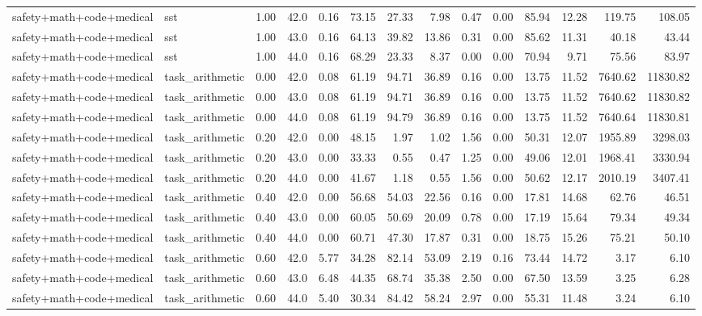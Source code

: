 \documentclass{article}
\begin{document}
\begin{table}[H]
{\begin{tabular}{llllrrrrrrrrrr}
safety+math+code+medical & sst & 1.00 & 42.0 & 0.16 & 73.15 & 27.33 & 7.98 & 0.47 & 0.00 & 85.94 & 12.28 & 119.75 & 108.05 \\
safety+math+code+medical & sst & 1.00 & 43.0 & 0.16 & 64.13 & 39.82 & 13.86 & 0.31 & 0.00 & 85.62 & 11.31 & 40.18 & 43.44 \\
safety+math+code+medical & sst & 1.00 & 44.0 & 0.16 & 68.29 & 23.33 & 8.37 & 0.00 & 0.00 & 70.94 & 9.71 & 75.56 & 83.97 \\
safety+math+code+medical & task\_arithmetic & 0.00 & 42.0 & 0.08 & 61.19 & 94.71 & 36.89 & 0.16 & 0.00 & 13.75 & 11.52 & 7640.62 & 11830.82 \\
safety+math+code+medical & task\_arithmetic & 0.00 & 43.0 & 0.08 & 61.19 & 94.71 & 36.89 & 0.16 & 0.00 & 13.75 & 11.52 & 7640.62 & 11830.82 \\
safety+math+code+medical & task\_arithmetic & 0.00 & 44.0 & 0.08 & 61.19 & 94.79 & 36.89 & 0.16 & 0.00 & 13.75 & 11.52 & 7640.64 & 11830.81 \\
safety+math+code+medical & task\_arithmetic & 0.20 & 42.0 & 0.00 & 48.15 & 1.97 & 1.02 & 1.56 & 0.00 & 50.31 & 12.07 & 1955.89 & 3298.03 \\
safety+math+code+medical & task\_arithmetic & 0.20 & 43.0 & 0.00 & 33.33 & 0.55 & 0.47 & 1.25 & 0.00 & 49.06 & 12.01 & 1968.41 & 3330.94 \\
safety+math+code+medical & task\_arithmetic & 0.20 & 44.0 & 0.00 & 41.67 & 1.18 & 0.55 & 1.56 & 0.00 & 50.62 & 12.17 & 2010.19 & 3407.41 \\
safety+math+code+medical & task\_arithmetic & 0.40 & 42.0 & 0.00 & 56.68 & 54.03 & 22.56 & 0.16 & 0.00 & 17.81 & 14.68 & 62.76 & 46.51 \\
safety+math+code+medical & task\_arithmetic & 0.40 & 43.0 & 0.00 & 60.05 & 50.69 & 20.09 & 0.78 & 0.00 & 17.19 & 15.64 & 79.34 & 49.34 \\
safety+math+code+medical & task\_arithmetic & 0.40 & 44.0 & 0.00 & 60.71 & 47.30 & 17.87 & 0.31 & 0.00 & 18.75 & 15.26 & 75.21 & 50.10 \\
safety+math+code+medical & task\_arithmetic & 0.60 & 42.0 & 5.77 & 34.28 & 82.14 & 53.09 & 2.19 & 0.16 & 73.44 & 14.72 & 3.17 & 6.10 \\
safety+math+code+medical & task\_arithmetic & 0.60 & 43.0 & 6.48 & 44.35 & 68.74 & 35.38 & 2.50 & 0.00 & 67.50 & 13.59 & 3.25 & 6.28 \\
safety+math+code+medical & task\_arithmetic & 0.60 & 44.0 & 5.40 & 30.34 & 84.42 & 58.24 & 2.97 & 0.00 & 55.31 & 11.48 & 3.24 & 6.10 \\

\end{tabular}}
\end{table}
\end{document}

